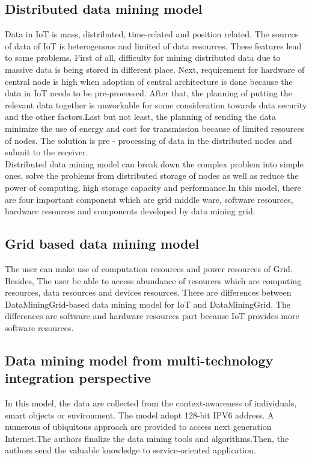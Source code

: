 \documentclass[a4paper,12pt]{article}
\begin{document}
{\subsection{Distributed data mining model}
Data in IoT is mass, distributed, time-related and position related. The sources of data of IoT is heterogenous and limited of data resources. These features lead to some problems. First of all, difficulty for mining distributed data due to massive data is being stored in different place. Next, requirement for hardware of central node is high when adoption of central architecture is done because the data in IoT needs to be pre-processed. After that, the planning of putting the relevant data together is unworkable for some consideration towards data security and the other factors.Last but not least, the planning of sending the data minimize the use of energy and cost for transmission because of limited resources of nodes. The solution is pre - processing of data in the distributed nodes and submit to the receiver. \\
\indent 
Distributed data mining model can break down the complex problem into simple ones, solve the problems from distributed storage of nodes as well as reduce the power of computing, high storage capacity and performance.In this model, there are four important component which are grid middle ware, software resources, hardware resources and components developed by data mining grid.
\subsection{Grid based data mining model}
The user can make use of computation resources and power resources of Grid. Besides, The user be able to access abundance of resources which are computing resources, data resources and devices resources. There are differences between DataMiningGrid-based data mining model for IoT and DataMiningGrid. The differences are software and hardware resources part because IoT provides more software resources.
\subsection{Data mining model from multi-technology integration perspective}
In this model, the data are collected from the context-awareness of individuals, smart objects or environment. The model adopt 128-bit IPV6 address. A numerous of ubiquitous approach are provided to access next generation Internet.The authors finalize the data mining tools and algorithms.Then, the authors send the valuable knowledge to service-oriented application.
}
\end{document}
